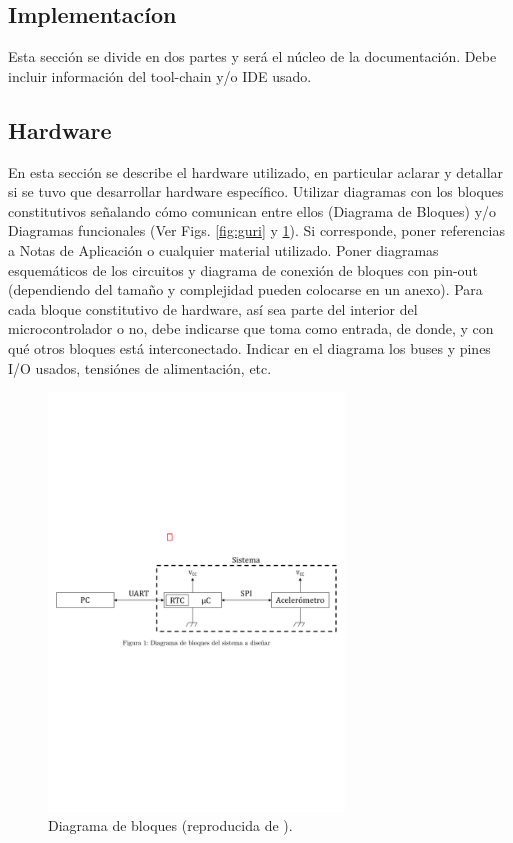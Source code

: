 \documentclass[a4paper,12pt]{article}
\begin{document}
\begin{linenumbers}
\section{Implementac\'ion}
\label{sec:implementacion}

Esta secci\'on se divide en dos partes y será el n\'ucleo de la documentaci\'on. Debe incluir información del tool-chain y/o IDE usado.

\subsection{Hardware}
\label{sec:hardware}

En esta secci\'on se describe el hardware utilizado, en particular aclarar y detallar si se tuvo que desarrollar hardware específico. Utilizar diagramas con los bloques constitutivos señalando cómo comunican entre ellos (Diagrama de Bloques) y/o Diagramas funcionales (Ver Figs. \ref{fig:guri} y  \ref{fig:dhbewsdc}). Si corresponde, poner referencias a Notas de Aplicación o cualquier material utilizado. Poner diagramas esquem\'aticos de los circuitos y diagrama de conexi\'on de bloques con pin-out (dependiendo del tamaño y complejidad pueden colocarse en un anexo). Para cada bloque constitutivo de hardware, as\'i sea parte del interior del microcontrolador o no, debe indicarse que toma como entrada, de donde, y con qué otros bloques está interconectado. Indicar en el diagrama los buses y pines I/O usados, tensi\'ones de alimentaci\'on, etc.

\begin{figure}[ht]
  \begin{center}
    \includegraphics[width=0.7\textwidth]{bloques.pdf}
  \end{center}
  \caption{Diagrama de bloques (reproducida de \cite{facal2017}). }
  \label{fig:dhbewsdc}
\end{figure}


\end{linenumbers}
\end{document}
